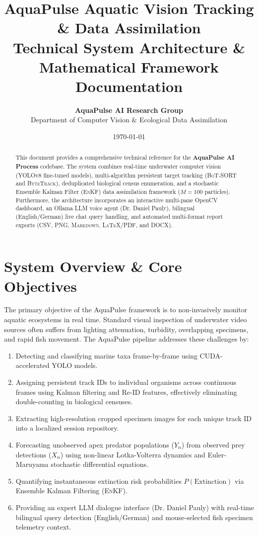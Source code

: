 \documentclass[11pt,a4paper]{article}
\title{\textbf{\huge AquaPulse Aquatic Vision Tracking \& Data Assimilation}\\[0.3cm]
\Large Technical System Architecture \& Mathematical Framework Documentation}
\author{\textbf{AquaPulse AI Research Group} \\ Department of Computer Vision \& Ecological Data Assimilation}
\date{\today}
\begin{document}
\maketitle

\begin{abstract}
This document provides a comprehensive technical reference for the \textbf{AquaPulse AI Process} codebase. The system combines real-time underwater computer vision (YOLOv8 fine-tuned models), multi-algorithm persistent target tracking (\textsc{BoT-SORT} and \textsc{ByteTrack}), deduplicated biological census enumeration, and a stochastic Ensemble Kalman Filter (\textsc{EnKF}) data assimilation framework ($M=100$ particles). Furthermore, the architecture incorporates an interactive multi-pane OpenCV dashboard, an Ollama LLM voice agent (Dr. Daniel Pauly), bilingual (English/German) live chat query handling, and automated multi-format report exports (\textsc{CSV}, \textsc{PNG}, \textsc{Markdown}, \textsc{LaTeX/PDF}, and \textsc{DOCX}).
\end{abstract}

\tableofcontents
\newpage

\section{System Overview \& Core Objectives}
The primary objective of the AquaPulse framework is to non-invasively monitor aquatic ecosystems in real time. Standard visual inspection of underwater video sources often suffers from lighting attenuation, turbidity, overlapping specimens, and rapid fish movement. The AquaPulse pipeline addresses these challenges by:
\begin{enumerate}
    \item Detecting and classifying marine taxa frame-by-frame using CUDA-accelerated YOLO models.
    \item Assigning persistent track IDs to individual organisms across continuous frames using Kalman filtering and Re-ID features, effectively eliminating double-counting in biological censuses.
    \item Extracting high-resolution cropped specimen images for each unique track ID into a localized session repository.
    \item Forecasting unobserved apex predator populations ($Y_n$) from observed prey detections ($X_n$) using non-linear Lotka-Volterra dynamics and Euler-Maruyama stochastic differential equations.
    \item Quantifying instantaneous extinction risk probabilities $P(\text{Extinction})$ via Ensemble Kalman Filtering (\textsc{EnKF}).
    \item Providing an expert LLM dialogue interface (Dr. Daniel Pauly) with real-time bilingual query detection (English/German) and mouse-selected fish specimen telemetry context.
\end{enumerate}
\end{document}
